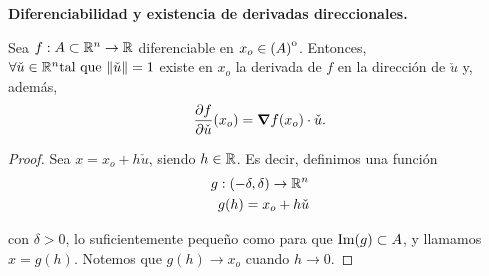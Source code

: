 \begin{theorem}\textbf{Diferenciabilidad y existencia de derivadas direccionales.}\label{teo:difDir}
\mbox{}

Sea $f: A \subset \mathbb{R}^n \to \mathbb{R}$ diferenciable en $x_o \in {\kern0pt(A)}^{\mathrm{o}}$. Entonces, $\forall \check{u} \in \mathbb{R}^n \text{tal que } \norm{\check{u}} = 1$ existe en $x_o$ la derivada de $f$ en la direcci\'on de $\check{u}$ y, adem\'as,
\[
 \frac{\partial f}{\partial \check{u}} (x_o) = \grad f (x_o) \cdot \check{u}.
\]

 \begin{proof}
 \mbox{}
 
 Sea $x = x_o + h \check{u}$, siendo $h \in \mathbb{R}$. Es decir, definimos una funci\'on 
 \begin{align*}
      g & :(-\delta,\delta) \to \mathbb{R}^n \\
        & g(h) = x_o + h \check{u}
 \end{align*}

con $\delta > 0$, lo suficientemente peque\~{n}o como para que $\operatorname{Im}(g) \subset A$, y llamamos $x = g(h)$. Notemos que $g(h) \to x_o$ cuando $h \to 0$. 


\end{proof}
\end{theorem}

